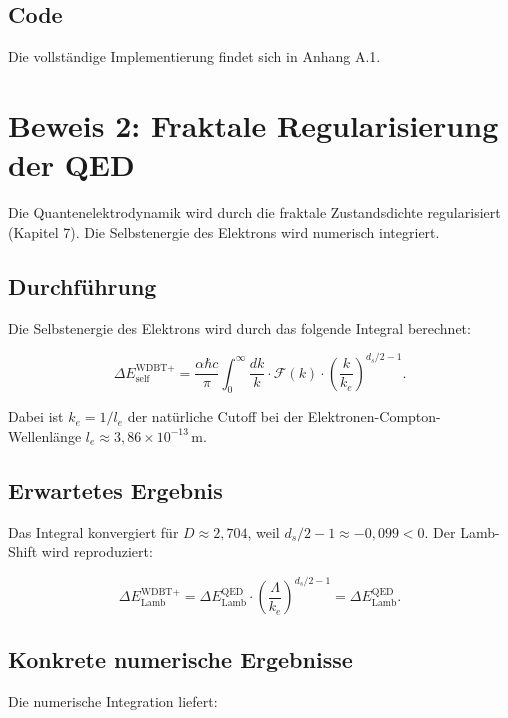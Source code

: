 \subsection{Code}

Die vollständige Implementierung findet sich in Anhang A.1.

\section{Beweis 2: Fraktale Regularisierung der QED}

Die Quantenelektrodynamik wird durch die fraktale Zustandsdichte regularisiert (Kapitel 7). Die Selbstenergie des Elektrons wird numerisch integriert.

\subsection{Durchführung}

Die Selbstenergie des Elektrons wird durch das folgende Integral berechnet:

\begin{equation}
\Delta E_{\text{self}}^{\text{WDBT+}} = \frac{\alpha \hbar c}{\pi} \int_0^{\infty} \frac{dk}{k} \cdot \mathcal{F}(k) \cdot \left( \frac{k}{k_e} \right)^{d_s/2 - 1}. \tag{9.1}
\end{equation}

Dabei ist \( k_e = 1/l_e \) der natürliche Cutoff bei der Elektronen-Compton-Wellenlänge \( l_e \approx 3,86 \times 10^{-13} \, \text{m} \).

\subsection{Erwartetes Ergebnis}

Das Integral konvergiert für \( D \approx 2,704 \), weil \( d_s/2 - 1 \approx -0,099 < 0 \). Der Lamb-Shift wird reproduziert:

\begin{equation}
\Delta E_{\text{Lamb}}^{\text{WDBT+}} = \Delta E_{\text{Lamb}}^{\text{QED}} \cdot \left( \frac{\Lambda}{k_e} \right)^{d_s/2 - 1} = \Delta E_{\text{Lamb}}^{\text{QED}}. \tag{9.2}
\end{equation}

\subsection{Konkrete numerische Ergebnisse}

Die numerische Integration liefert:

